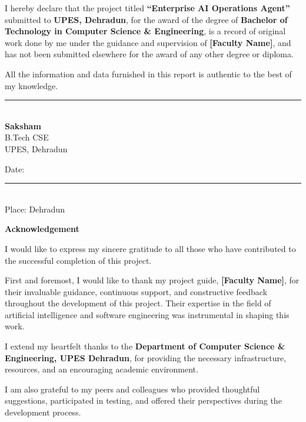 \documentclass[12pt, a4paper]{report}
\begin{document}
\vspace{1cm}

I hereby declare that the project titled \textbf{``Enterprise AI Operations Agent''} submitted to \textbf{UPES, Dehradun}, for the award of the degree of \textbf{Bachelor of Technology in Computer Science \& Engineering}, is a record of original work done by me under the guidance and supervision of \textbf{[Faculty Name]}, and has not been submitted elsewhere for the award of any other degree or diploma.

All the information and data furnished in this report is authentic to the best of my knowledge.

\vspace{3cm}

\begin{flushright}
\rule{5cm}{0.4pt}\\
\textbf{Saksham}\\
B.Tech CSE\\
UPES, Dehradun
\end{flushright}

\vspace{1cm}

Date: \rule{3cm}{0.4pt}\\
Place: Dehradun

\newpage
\thispagestyle{empty}
\begin{center}
{\LARGE \textbf{Acknowledgement}}
\end{center}

\vspace{1cm}

I would like to express my sincere gratitude to all those who have contributed to the successful completion of this project.

First and foremost, I would like to thank my project guide, \textbf{[Faculty Name]}, for their invaluable guidance, continuous support, and constructive feedback throughout the development of this project. Their expertise in the field of artificial intelligence and software engineering was instrumental in shaping this work.

I extend my heartfelt thanks to the \textbf{Department of Computer Science \& Engineering, UPES Dehradun}, for providing the necessary infrastructure, resources, and an encouraging academic environment.

I am also grateful to my peers and colleagues who provided thoughtful suggestions, participated in testing, and offered their perspectives during the development process.
\end{document}
